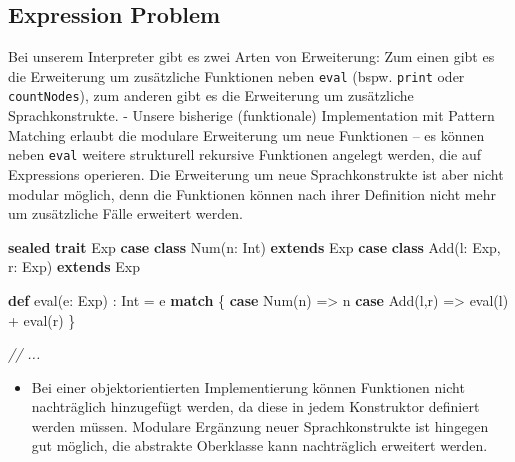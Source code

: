 \documentclass[]{article}
\newenvironment{Shaded}{}{}
\newcommand{\CommentTok}[1]{\textcolor[rgb]{0.38,0.63,0.69}{\textit{#1}}}
\newcommand{\FunctionTok}[1]{\textcolor[rgb]{0.02,0.16,0.49}{#1}}
\newcommand{\KeywordTok}[1]{\textcolor[rgb]{0.00,0.44,0.13}{\textbf{#1}}}
\newcommand{\NormalTok}[1]{#1}
\providecommand{\tightlist}{%
  \setlength{\itemsep}{0pt}\setlength{\parskip}{0pt}}
\begin{document}
\hypertarget{expression-problem}{%
\subsection{Expression Problem}\label{expression-problem}}

Bei unserem Interpreter gibt es zwei Arten von Erweiterung: Zum einen
gibt es die Erweiterung um zusätzliche Funktionen neben \texttt{eval}
(bspw. \texttt{print} oder \texttt{countNodes}), zum anderen gibt es die
Erweiterung um zusätzliche Sprachkonstrukte. - Unsere bisherige
(funktionale) Implementation mit Pattern Matching erlaubt die modulare
Erweiterung um neue Funktionen -- es können neben \texttt{eval} weitere
strukturell rekursive Funktionen angelegt werden, die auf Expressions
operieren. Die Erweiterung um neue Sprachkonstrukte ist aber nicht
modular möglich, denn die Funktionen können nach ihrer Definition nicht
mehr um zusätzliche Fälle erweitert werden.

\begin{Shaded}
\begin{Highlighting}[]
\KeywordTok{sealed} \KeywordTok{trait}\NormalTok{ Exp}
\KeywordTok{case} \KeywordTok{class} \FunctionTok{Num}\NormalTok{(n: Int) }\KeywordTok{extends}\NormalTok{ Exp}
\KeywordTok{case} \KeywordTok{class} \FunctionTok{Add}\NormalTok{(l: Exp, r: Exp) }\KeywordTok{extends}\NormalTok{ Exp}

\KeywordTok{def} \FunctionTok{eval}\NormalTok{(e: Exp) : Int = e }\KeywordTok{match}\NormalTok{ \{}
  \KeywordTok{case} \FunctionTok{Num}\NormalTok{(n) =\textgreater{} n}
  \KeywordTok{case} \FunctionTok{Add}\NormalTok{(l,r) =\textgreater{} }\FunctionTok{eval}\NormalTok{(l) + }\FunctionTok{eval}\NormalTok{(r)}
\NormalTok{\}}

\CommentTok{// ...}
\end{Highlighting}
\end{Shaded}

\begin{itemize}
\tightlist
\item
  Bei einer objektorientierten Implementierung können Funktionen nicht
  nachträglich hinzugefügt werden, da diese in jedem Konstruktor
  definiert werden müssen. Modulare Ergänzung neuer Sprachkonstrukte ist
  hingegen gut möglich, die abstrakte Oberklasse kann nachträglich
  erweitert werden.
\end{itemize}
\end{document}
